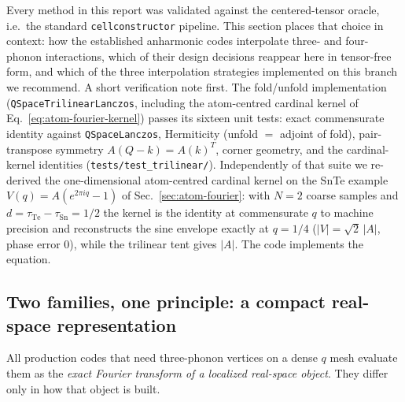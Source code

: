 \documentclass[11pt,a4paper]{article}
\begin{document}
Every method in this report was validated against the centered-tensor
oracle, i.e.\ the standard \texttt{cellconstructor} pipeline.  This
section places that choice in context: how the established anharmonic
codes interpolate three- and four-phonon interactions, which of their
design decisions reappear here in tensor-free form, and which of the
three interpolation strategies implemented on this branch we recommend.
A short verification note first.  The fold/unfold implementation
(\texttt{QSpaceTrilinearLanczos}, including the atom-centred cardinal
kernel of Eq.~\eqref{eq:atom-fourier-kernel}) passes its sixteen unit
tests: exact commensurate identity against \texttt{QSpaceLanczos},
Hermiticity (unfold $=$ adjoint of fold), pair-transpose symmetry
$A(Q-k)=A(k)^{T}$, corner geometry, and the cardinal-kernel identities
(\texttt{tests/test\_trilinear/}).  Independently of that suite we
re-derived the one-dimensional atom-centred cardinal kernel on the SnTe
example $V(q)=A(e^{2\pi i q}-1)$ of Sec.~\ref{sec:atom-fourier}: with
$N=2$ coarse samples and $d=\tau_{\mathrm{Te}}-\tau_{\mathrm{Sn}}=1/2$ the
kernel is the identity at commensurate $q$ to machine precision and
reconstructs the sine envelope exactly at $q=1/4$ ($|V|=\sqrt2\,|A|$,
phase error $0$), while the trilinear tent gives $|A|$.  The code
implements the equation.

\subsection{Two families, one principle: a compact real-space
representation}
\label{sec:codes-families}

All production codes that need three-phonon vertices on a dense $q$ mesh
evaluate them as the \emph{exact Fourier transform of a localized
real-space object}.  They differ only in how that object is built.
\end{document}
